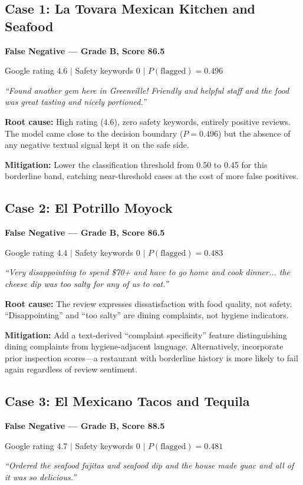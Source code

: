 \documentclass{article}
\begin{document}
\subsection{Case 1: La Tovara Mexican Kitchen and Seafood}
\textbf{False Negative --- Grade B, Score 86.5}

Google rating 4.6 $|$ Safety keywords 0 $|$ $P(\text{flagged}) = 0.496$

\textit{``Found another gem here in Greenville! Friendly and helpful staff and the food was great tasting and nicely portioned.''}

\textbf{Root cause:} High rating (4.6), zero safety keywords, entirely positive reviews. The model came close to the decision boundary ($P=0.496$) but the absence of any negative textual signal kept it on the safe side.

\textbf{Mitigation:} Lower the classification threshold from 0.50 to 0.45 for this borderline band, catching near-threshold cases at the cost of more false positives.

\subsection{Case 2: El Potrillo Moyock}
\textbf{False Negative --- Grade B, Score 86.5}

Google rating 4.4 $|$ Safety keywords 0 $|$ $P(\text{flagged}) = 0.483$

\textit{``Very disappointing to spend \$70+ and have to go home and cook dinner... the cheese dip was too salty for any of us to eat.''}

\textbf{Root cause:} The review expresses dissatisfaction with food quality, not safety. ``Disappointing'' and ``too salty'' are dining complaints, not hygiene indicators.

\textbf{Mitigation:} Add a text-derived ``complaint specificity'' feature distinguishing dining complaints from hygiene-adjacent language. Alternatively, incorporate prior inspection scores---a restaurant with borderline history is more likely to fail again regardless of review sentiment.

\subsection{Case 3: El Mexicano Tacos and Tequila}
\textbf{False Negative --- Grade B, Score 88.5}

Google rating 4.7 $|$ Safety keywords 0 $|$ $P(\text{flagged}) = 0.481$

\textit{``Ordered the seafood fajitas and seafood dip and the house made guac and all of it was so delicious.''}
\end{document}
